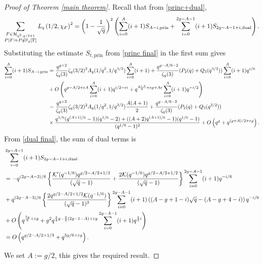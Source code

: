 \documentclass[table]{amsart}
\numberwithin{equation}{section}
\begin{document}
\begin{proof}[Proof of Theorem \ref{main theorem}]
    \par Recall that from \eqref{princ+dual},
\begin{equation*}
    \sum_{\substack{F \in \mathcal{H}_{q^{2}, g / 2+1} \\ P \mid F \Rightarrow P \notin \mathbb{F}_{q}[T]}} L_{q}\left(1 / 2, \chi_{F}\right)^2 
  = \left(1-\frac{1}{\sqrt{q}}\right)^2\left(\sum_{i=0}^{A}(i+1)S_{A-i, \rm{prin}}+\sum_{i=0}^{2g-A-1}(i+1)S_{2g-A-1+i, \rm{dual}}\right). 
\end{equation*}
\noindent Substituting the estimate $ S_{t,\mathrm{prin}}$  from \eqref{princ final} in the first sum gives
{\small\begin{align*}
    \sum_{i=0}^{A}(i+1)S_{A-i, \rm{prin}}&= \frac{q^{g+2}}{\zeta_{q}(3)}\zeta_{q}(3/2)^2A_q(1/q^2,1/q^{3/2})\sum_{i=0}^{A}(i+1)+ \frac{q^{g-A/6-2}}{\zeta_{q}(3)}(P_2(q)+Q_3(q^{3/2}))\sum_{i=0}^{A}(i+1){q^{i/6}}\\&+O\left(q^{g-A/2+\varepsilon A}\sum_{i=0}^{A}(i+1)q^{i/2-\varepsilon i}+q^{\frac{g+A}{2}+\varepsilon g+A\varepsilon}\sum_{i=0}^{A}(i+1)q^{-i/2}\right)\\
    &= \frac{q^{g+2}}{\zeta_{q}(3)}\zeta_{q}(3/2)^2A_q(1/q^2,1/q^{3/2})\frac{A(A+1)}{2}+\frac{q^{g-A/6-2}}{\zeta_{q}(3)}(P_2(q)+Q_3(q^{3/2}))\\&\times \frac{q^{1/6}(q^{(A+1)/6}-1)(q^{1/6}-2)+((A+2)q^{(A+1)/6}-1)(q^{1/6}-1)}{(q^{1/6}-1)^2}+O\left(q^{g}+q^{(g+A)/2+\varepsilon g}\right).
\end{align*}}
\noindent From \eqref{dual final}, the sum of dual terms is 
{\small \begin{align*}
   & \sum_{i=0}^{2g-A-1}(i+1)S_{2g-A-1+i, \rm{dual}}\\&=-q^{(2g-A-3)/6}\left\{ \frac{\mathcal{K}'(q^{-1/6}) q^{g/2-A/2+1/3}}{(\sqrt{q}-1)}+\frac{2\mathcal{K}(q^{-1/6})q^{g/2-A/2+1/2}}{(\sqrt{q}-1)}\right\}\sum_{i=0}^{2g-A-1}(i+1)q^{-i/6}\\
&+q^{(2g-A-3)/6}\left\{\frac{2 q^{g/2-A/2+1/2}\mathcal{K}(q^{-1/6})}{(\sqrt{q}-1)^2} \right\}\sum_{i=0}^{2g-A-1}(i+1)\left((A-g+1-i)\sqrt{q}-(A-g+4-i)\right)q^{-i/6}\\&+O\left(q^{\frac{5 g}{6}+\varepsilon g}+g^2 q^{\frac{3}{4}g -\frac{2}{3}(2g-1-A)+\varepsilon g}\sum_{i=0}^{2g-A-1}(i+1)q^{\frac{2}{3}i}\right)\\
&=O\left(q^{g/2-A/2+1/3}+q^{5 g/6+\varepsilon g}\right).
\end{align*}}

We set $A:=g/2$, this gives the required result.
\end{proof}



\end{document}
